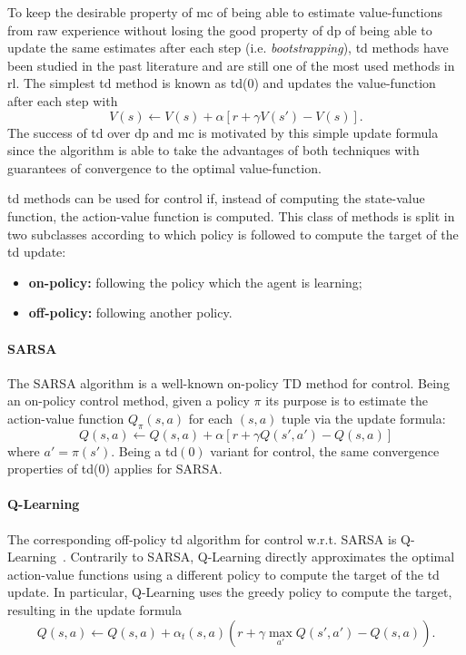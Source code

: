 To keep the desirable property of \gls{mc} of being able to estimate value-functions from raw experience without losing the good property of \gls{dp} of being able to update the same estimates after each step (i.e. \textit{bootstrapping}), \gls{td} methods have been studied in the past literature and are still one of the most used methods in \gls{rl}. The simplest \gls{td} method is known as \gls{td}(0) and updates the value-function after each step with
\begin{equation}
 V(s) \leftarrow V(s) + \alpha [r + \gamma V(s') - V(s)].
\end{equation}
The success of \gls{td} over \gls{dp} and \gls{mc} is motivated by this simple update formula since the algorithm is able to take the advantages of both techniques with guarantees of convergence to the optimal value-function.

\gls{td} methods can be used for control if, instead of computing the state-value function, the action-value function is computed. This class of methods is split in two subclasses according to which policy is followed to compute the target of the \gls{td} update:
\begin{itemize}
 \item \textbf{on-policy:} following the policy which the agent is learning;
 \item \textbf{off-policy:} following another policy.
\end{itemize}

\paragraph{SARSA}\label{S:SARSA}
The SARSA algorithm is a well-known on-policy TD method for control. Being an on-policy control method, given a policy $\pi$ its purpose is to estimate the action-value function $Q_\pi(s,a)$ for each $(s,a)$ tuple via the update formula:
\begin{equation}
 Q(s,a) \leftarrow Q(s,a) + \alpha [r + \gamma Q(s',a') - Q(s,a)]
\end{equation}
where $a' = \pi(s')$. Being a \gls{td}$(0)$ variant for control, the same convergence properties of \gls{td}(0) applies for SARSA.
\paragraph{Q-Learning}\label{S:Q-Learning}
The corresponding off-policy \gls{td} algorithm for control w.r.t. SARSA is Q-Learning~\cite{watkins1989learning}. Contrarily to SARSA, Q-Learning directly approximates the optimal action-value functions using a different policy to compute the target of the \gls{td} update. In particular, Q-Learning uses the greedy policy to compute the target, resulting in the update formula
\begin{equation}\label{eq:Q-formula}
 Q(s,a) \leftarrow Q(s,a) + \alpha_t(s,a) \left(r + \gamma \max_{a'} Q(s',a') - Q(s,a)\right).
\end{equation}

